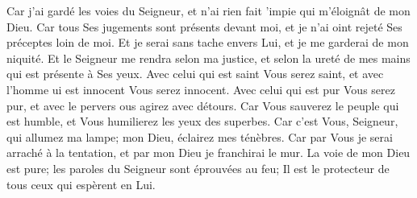 {\VERSE Car j'ai gardé les voies du Seigneur, et n'ai rien fait 'impie qui m'éloignât de mon Dieu. \EVERSE
\VERSE Car tous Ses jugements sont présents devant moi, et je n'ai oint rejeté Ses préceptes loin de moi. \EVERSE
\VERSE Et je serai sans tache envers Lui, et je me garderai de mon niquité. \EVERSE
\VERSE Et le Seigneur me rendra selon ma justice, et selon la ureté de mes mains qui est présente à Ses yeux. \EVERSE
\VERSE Avec celui qui est saint Vous serez saint, et avec l'homme ui est innocent Vous serez innocent. \EVERSE
\VERSE Avec celui qui est pur Vous serez pur, et avec le pervers ous agirez avec détours. \EVERSE
\VERSE Car Vous sauverez le peuple qui est humble, et Vous humilierez les yeux des superbes. \EVERSE
\VERSE Car c'est Vous, Seigneur, qui allumez ma lampe; mon Dieu, éclairez mes ténèbres. \EVERSE
\VERSE Car par Vous je serai arraché à la tentation, et par mon Dieu je franchirai le mur. \EVERSE
\VERSE La voie de mon Dieu est pure; les paroles du Seigneur sont éprouvées au feu; Il est le protecteur de tous ceux qui espèrent en Lui.
}
